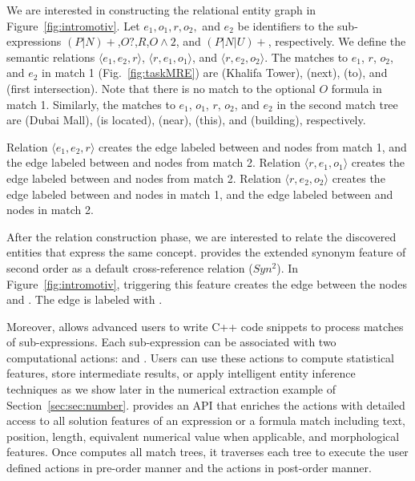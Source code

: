 We are interested in constructing the relational entity graph in Figure~\ref{fig:intromotiv}.
Let $e_1,o_1,r,o_2,$ and $e_2$ be identifiers to the sub-expressions 
$(P|N)+$,$O?$,$R$,$O\wedge 2$, and $(P|N|U)+$, respectively.
We define the semantic relations $\langle e_1, e_2, r\rangle$, $\langle r, e_1, o_1\rangle$, and $\langle r,e_2,o_2\rangle$.
The matches to $e_1$, $r$, $o_2$, and $e_2$ in match 1 (Fig.~\ref{fig:taskMRE}) are  (Khalifa Tower),  (next),  (to), and  (first intersection).
Note that there is no match to the optional $O$ formula in match 1.
Similarly, the matches to $e_1$, $o_1$, $r$, $o_2$, and $e_2$ in the second match tree are
 (Dubai Mall),  (is located),  (near),  (this), and  (building), respectively.

Relation $\langle e_1,e_2,r\rangle$ creates the 
edge labeled  between  and 
 nodes from match 1, and the 
edge labeled  between  and  nodes from match 2.
Relation $\langle r,e_1,o_1\rangle$ creates the edge labeled  
between  and  nodes from match 2. 
Relation $\langle r,e_2,o_2\rangle$ creates the edge labeled  
between  and  nodes in 
match 1, and the 
edge labeled  between  and  
nodes in match 2.

After the relation construction phase, we are interested to relate the discovered entities
that express the same concept.
\framework provides the extended synonym feature of second order as a default cross-reference relation ($Syn^2$).
In Figure~\ref{fig:intromotiv}, triggering this feature creates the edge between the nodes  and .
The edge is labeled with .

Moreover, \framework allows advanced users to write C++ code snippets 
to process matches of sub-expressions.
Each sub-expression can be associated with two computational actions:  and .
Users can use these actions to compute statistical features, 
store intermediate results, 
or apply intelligent entity inference techniques
as we show later in the numerical extraction example of Section~\ref{sec:sec:number}.
\framework provides an API that enriches the actions with detailed access to
all solution features of an expression or a formula match including 
text, position, length, equivalent numerical value when applicable, 
and morphological features.
Once \framework computes all match trees, it traverses each tree to 
execute the user defined  actions in pre-order manner
and the  actions in post-order manner.


